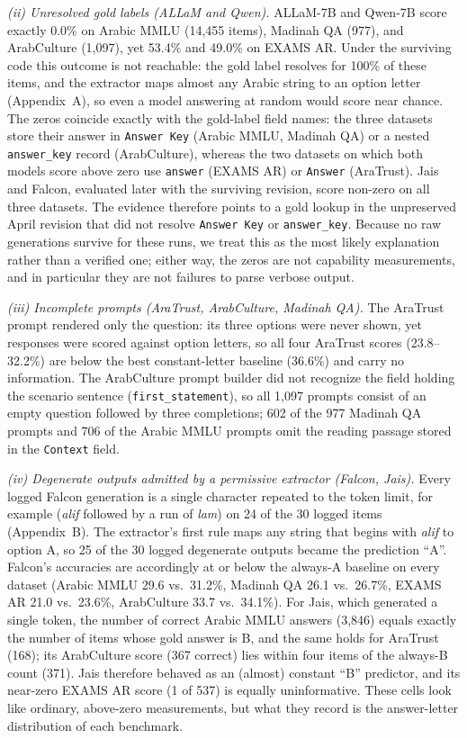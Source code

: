 \emph{(ii) Unresolved gold labels (ALLaM and Qwen).} ALLaM-7B and Qwen-7B score exactly
0.0\% on Arabic MMLU (14,455 items), Madinah QA (977), and ArabCulture (1,097), yet
53.4\% and 49.0\% on EXAMS AR. Under the surviving code this outcome is not reachable:
the gold label resolves for 100\% of these items, and the extractor maps almost any
Arabic string to an option letter (Appendix~A), so even a model answering at random
would score near chance. The zeros coincide exactly with the gold-label field names:
the three datasets store their answer in \texttt{Answer Key} (Arabic MMLU, Madinah QA)
or a nested \texttt{answer\_key} record (ArabCulture), whereas the two datasets on which
both models score above zero use \texttt{answer} (EXAMS AR) or \texttt{Answer}
(AraTrust). Jais and Falcon, evaluated later with the surviving revision, score
non-zero on all three datasets. The evidence therefore points to a gold lookup in the
unpreserved April revision that did not resolve \texttt{Answer Key} or
\texttt{answer\_key}. Because no raw generations survive for these runs, we treat this
as the most likely explanation rather than a verified one; either way, the zeros are
not capability measurements, and in particular they are not failures to parse verbose
output.

\emph{(iii) Incomplete prompts (AraTrust, ArabCulture, Madinah QA).} The AraTrust prompt
rendered only the question: its three options were never shown, yet responses were
scored against option letters, so all four AraTrust scores (23.8--32.2\%) are below the
best constant-letter baseline (36.6\%) and carry no information. The ArabCulture prompt
builder did not recognize the field holding the scenario sentence
(\texttt{first\_statement}), so all 1,097 prompts consist of an empty question followed
by three completions; 602 of the 977 Madinah QA prompts and 706 of the Arabic MMLU prompts
omit the reading passage stored in the \texttt{Context} field.

\emph{(iv) Degenerate outputs admitted by a permissive extractor (Falcon, Jais).} Every
logged Falcon generation is a single character repeated to the token limit, for example
 (\emph{alif} followed by a run of \emph{lam}) on 24 of the 30 logged
items (Appendix~B). The extractor's first rule maps any string that begins with
\emph{alif} to option A, so 25 of the 30 logged degenerate outputs became the prediction
``A''. Falcon's accuracies are accordingly at or below the always-A baseline on every
dataset (Arabic MMLU 29.6 vs.\ 31.2\%, Madinah QA 26.1 vs.\ 26.7\%, EXAMS AR 21.0 vs.\
23.6\%, ArabCulture 33.7 vs.\ 34.1\%). For Jais, which generated a single token, the
number of correct Arabic MMLU answers (3,846) equals exactly the number of items whose
gold answer is B, and the same holds for AraTrust (168); its ArabCulture score (367
correct) lies within four items of the always-B count (371). Jais therefore behaved as
an (almost) constant ``B'' predictor, and its near-zero EXAMS AR score (1 of 537) is
equally uninformative. These cells look like ordinary, above-zero measurements, but
what they record is the answer-letter distribution of each benchmark.

